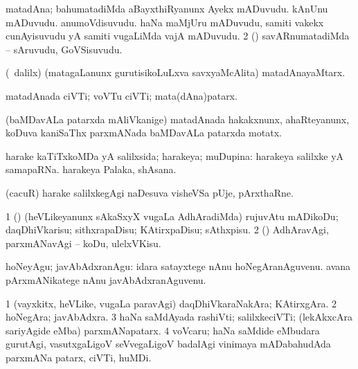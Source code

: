 \bentry
{} 
\gl{\nA}
\expl{}
\bmng
\bnum
{} matadAna; bahumatadiMda 
\banum
{} aBayxthiRyanunx Ayekx mADuvudu. 
 kAnUnu mADuvudu. 
 anumoVdisuvudu. 
 haNa maMjUru mADuvudu, samiti \mo vakekx cunAyisuvudu yA samiti \mo vugaLiMda vajA mADuvudu. 
\eanum
\numie
\num{2} (\AmA) savARnumatadiMda -- sAruvudu, GoVSisuvudu. 
\enum
\emng
\eentry

\bentry
{} 
\gl{\nA}
\expl{}
\bmng
 (\kanmu\ \ame dalilx) (matagaLanunx gurutisikoLuLxva savxyaMcAlita) matadAnayaMtarx. 
\emng
\eentry

\bentry
{} 
\gl{\nA}
\expl{}
\bmng
 matadAnada ciVTi; voVTu ciVTi; mata(dAna)patarx. 
\emng
\eentry

\bentry 
{}
\gl{\nA}
\expl{}
\bmng
 (baMDavALa patarxda mAliVkanige) matadAnada hakakxnunx, ahaRteyanunx, koDuva kaniSaThx parxmANada baMDavALa patarxda motatx. 
\emng
\eentry

\bentry 
{} 
\gl{\gu}
\bmng
 harake kaTiTxkoMDa yA salilxsida; harakeya; muDupina:  harakeya salilxke yA samapaRNa.  harakeya Palaka, shAsana. 
\emng
\eentry

\bentry
{}
\gl{\nA}
\expl{}
\bmng
 (cacuR) harake salilxkegAgi naDesuva visheVSa pUje, pArxthaRne. 
\emng
\eentry

\bentry 
{} 
\gl{\akirx}
\expl{}
\bmng
\bnum
\num{1} (\pArxparx) (heVLikeyanunx sAkaSxyX \mo vugaLa AdhAradiMda) rujuvAtu mADikoDu; daqDhiVkarisu; sithxrapaDisu; KAtirxpaDisu; sAthxpisu. 
\num{2} (\pArxparx) AdhAravAgi, parxmANavAgi -- koDu, ulelxVKisu. 
\enum
\emng

\noindent 
\gl{\akirx}
\expl{}
\bmng
 hoNeyAgu; javAbAdxranAgu:  idara satayxtege nAnu hoNegAranAguvenu.  avana pArxmANikatege nAnu javAbAdxranAguvenu. 
\emng
\eentry

\bentry 
{} 
\gl{\nA}
\expl{}
\bmng
\bnum
\num{1} (vayxkitx, heVLike, \mo vugaLa paravAgi) daqDhiVkaraNakAra; KAtirxgAra. 
\num{2} hoNegAra; javAbAdxra. 
\num{3} haNa saMdAyada rashiVti; salilxkeciVTi; (lekAkxcAra sariyAgide eMba) parxmANapatarx. 
\num{4} voVcaru; haNa saMdide eMbudara gurutAgi, vasutxgaLigoV seVvegaLigoV badalAgi vinimaya mADabahudAda parxmANa patarx, ciVTi, huMDi. 
\enum
\emng
\eentry

